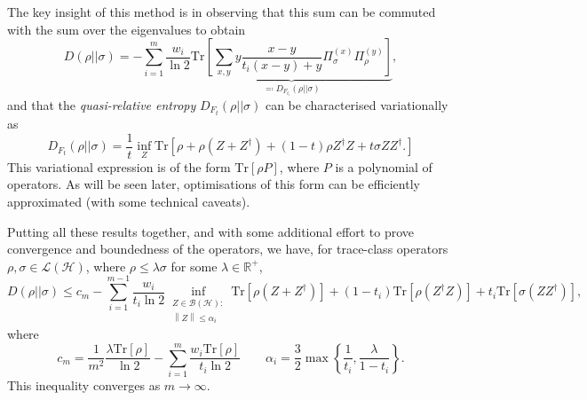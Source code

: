 \documentclass[10pt, a4paper]{article}
\numberwithin{equation}{section} %
\theoremstyle{definition}
\theoremstyle{plain}
\newcommand{\norm}[1]{\left\lVert#1\right\rVert}
\newcommand{\?}{\mathrel{?}} %
\newcommand{\R}{\mathbb{R}} %
\newcommand{\Tr}{\mathrm{Tr}} %
\newcommand{\Hs}{\mathcal{H}} %
\newcommand{\sB}{\mathcal{B}}
\begin{document}
      The key insight of this method is in observing that this sum can be commuted with the sum over the eigenvalues to obtain
      \begin{equation}
        D(\rho||\sigma) = - \sum_{i=1}^{m} \frac{w_i}{\ln 2} \underbrace{\Tr\left[ \sum_{x,y} y \frac{x-y}{t_i(x-y)+y} \Pi^{(x)}_{\sigma} \Pi^{(y)}_{\rho} \right]}_{\eqqcolon D_{F_{t_i}}(\rho||\sigma)},\label{eqn:re_from_qre}
      \end{equation}
      and that the \emph{quasi-relative entropy} \(D_{F_{t}}(\rho||\sigma)\) can be characterised variationally as
      \begin{equation}
        D_{F_{t}}(\rho||\sigma) = \frac{1}{t} \inf_Z \Tr\left[ \rho + \rho(Z + Z^{\dagger}) + (1-t)\rho{}Z^{\dagger}Z + t\sigma{}ZZ^{\dagger}. \right]\label{eqn:qre_var}
      \end{equation}
      This variational expression is of the form \(\Tr[\rho P]\), where \(P\) is a polynomial of operators. As will be seen later, optimisations of this form can be efficiently approximated (with some technical caveats).

      Putting all these results together, and with some additional effort to prove convergence and boundedness of the operators, we have, for trace-class operators \(\rho, \sigma \in \mathcal{L}(\Hs)\), where \(\rho \leq \lambda\sigma\) for some \(\lambda \in \R^+\),
      \begin{equation}
        D(\rho||\sigma) \leq c_m - \sum_{i=1}^{m-1} \frac{w_i}{t_i \ln 2} \inf_{\substack{Z \in \sB(\Hs) : \\ \norm{Z} \leq \alpha_i}} \Tr\left[\rho\left(Z + Z^{\dagger}\right)\right] + (1-t_i)\Tr\left[\rho\left(Z^{\dagger}Z\right)\right] + t_i\Tr\left[\sigma\left(ZZ^{\dagger}\right)\right],
      \end{equation}
      where
      \begin{equation}
        c_m = \frac{1}{m^2} \frac{\lambda \Tr[\rho]}{\ln 2} - \sum_{i=1}^m \frac{w_i \Tr[\rho]}{t_i \ln 2} \qquad \alpha_i = \frac{3}{2} \max\left\{\frac{1}{t_i}, \frac{\lambda}{1-t_i}\right\}.
      \end{equation}
      This inequality converges as \(m \to \infty\).
\end{document}
